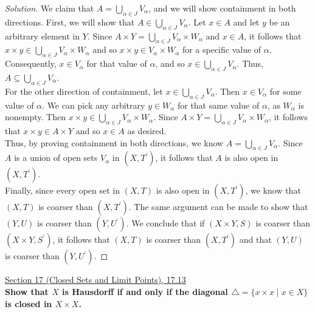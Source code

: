 \documentclass[11pt]{article}
\newenvironment{solution}
  {\renewcommand\qedsymbol{$\blacksquare$}\begin{proof}[Solution]}
  {\end{proof}}
\begin{document}
\begin{enumerate}[a)]
\begin{solution}
	We claim that $A = \bigcup\limits_{\alpha \in J} V_\alpha$, and we will show containment in both directions. First, we will show that $A \in \bigcup\limits_{\alpha \in J} V_\alpha$. Let $x \in A$ and let $y$ be an arbitrary element in $Y$.
	Since $A \times Y = \bigcup\limits_{\alpha \in J} V_{\alpha} \times W_{\alpha}$ and $x \in A$, it follows that $x \times y \in \bigcup\limits_{\alpha \in J} V_{\alpha} \times W_{\alpha}$ and so $x \times y \in V_\alpha \times W_\alpha$ for a specific value of $\alpha$. Consequently, $x \in V_\alpha$ for that 
	value of $\alpha$, and so $x \in \bigcup\limits_{\alpha \in J} V_\alpha$. Thus, $A \subseteq \bigcup\limits_{\alpha \in J} V_\alpha$. \\

	For the other direction of containment, let $x \in \bigcup\limits_{\alpha \in J} V_\alpha$. Then $x \in V_\alpha$ for some value of $\alpha$. We can pick any arbitrary $y \in W_\alpha$ for that same value of $\alpha$, as $W_\alpha$ is nonempty. Then
	$x \times y \in \bigcup\limits_{\alpha \in J} V_{\alpha} \times W_{\alpha}$. Since $A \times Y = \bigcup\limits_{\alpha \in J} V_{\alpha} \times W_{\alpha}$, it follows that $x \times y \in A \times Y$ and so $x \in A$ as desired. \\

	Thus, by proving containment in both directions, we know $A = \bigcup\limits_{\alpha \in J} V_\alpha$. Since $A$ is a union of open sets $V_\alpha$ in $(X, T^{\prime})$, it follows that
	$A$ is also open in $(X, T^{\prime})$. \\

	Finally, since every open set in $(X, T)$ is also open in $(X, T^{\prime})$, we know that $(X, T)$ is coarser than $(X, T^{\prime})$. The same argument can be made
	to show that $(Y, U)$ is coarser than $(Y, U^{\prime})$. We conclude that if $(X \times Y, S)$ is coarser than $(X \times Y, S^{\prime})$, it follows that 
	$(X, T)$ is coarser than $(X, T^{\prime})$ and that $(Y, U)$ is coarser than $(Y, U^{\prime})$.
	\end{solution}
\end{enumerate}

\newpage

\underline{Section 17 (Closed Sets and Limit Points), 17.13} \\

\textbf{Show that $X$ is Hausdorff if and only if the diagonal $\triangle = \{ x \times x \mid x \in X \}$ is closed in $X \times X$.}

\newpage
\end{document}
